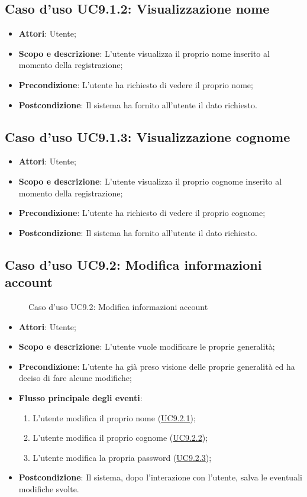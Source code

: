 \documentclass[12pt,a4paper]{article}
\begin{document}
\subsection{Caso d'uso UC9.1.2: Visualizzazione nome}\begin{itemize}
	\item \textbf{Attori}: Utente;
	\item \textbf{Scopo e descrizione}: L’utente visualizza il proprio nome inserito al momento della registrazione; 
	\item \textbf{Precondizione}: L’utente ha richiesto di vedere il proprio nome;
	\item \textbf{Postcondizione}: Il sistema ha fornito all’utente il dato richiesto.
\end{itemize}
\hypertarget{UC9.1.3}{}
\subsection{Caso d'uso UC9.1.3: Visualizzazione cognome}\begin{itemize}
	\item \textbf{Attori}: Utente;
	\item \textbf{Scopo e descrizione}: L’utente visualizza il proprio cognome inserito al momento della registrazione; 
	\item \textbf{Precondizione}: L’utente ha richiesto di vedere il proprio cognome;
	\item \textbf{Postcondizione}: Il sistema ha fornito all’utente il dato richiesto.
\end{itemize}
\hypertarget{UC9.2}{}
\subsection{Caso d'uso UC9.2: Modifica informazioni account}
\begin{figure}[H]
	\centering

	\caption{Caso d'uso UC9.2: Modifica informazioni account}\label{fig:UC9.2} 
\end{figure}\begin{itemize}
\item \textbf{Attori}: Utente;
\item \textbf{Scopo e descrizione}: L’utente vuole modificare le proprie generalità; 
\item \textbf{Precondizione}:  L’utente ha già preso visione delle proprie generalità ed ha deciso di fare alcune modifiche;

\item \textbf{Flusso principale degli eventi}:
\begin{enumerate}
	\item L’utente modifica il proprio nome (\hyperlink{UC9.2.1}{UC9.2.1});
	\item L’utente modifica il proprio cognome  (\hyperlink{UC9.2.2}{UC9.2.2});
	\item L’utente modifica la propria password (\hyperlink{UC9.2.3}{UC9.2.3});
	
\end{enumerate}
\item \textbf{Postcondizione}: Il sistema, dopo l’interazione con l’utente, salva le eventuali modifiche svolte.
\end{itemize}
\hypertarget{UC9.2.1}{}
\end{document}
